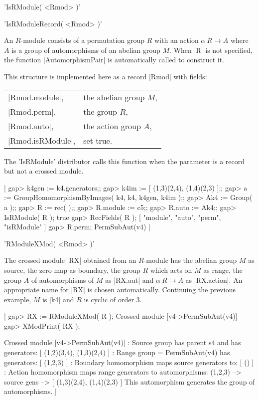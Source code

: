 %

'IsRModule( <Rmod> )'

'IsRModuleRecord( <Rmod> )'

An $R$-module consists of a permutation group $R$ with an action
$\alpha \: R \to A$  where  $A$  is a group of automorphisms
of an abelian group $M$.  When  |R|  is not specified, the function
|AutomorphismPair|  is automatically called to construct it.

This structure is implemented here as a record |Rmod| with fields:

\begin{tabular}{ll}
|Rmod.module|,     & the abelian group $M$,   \\
|Rmod.perm|,       & the group $R$,           \\
|Rmod.auto|,       & the action group $A$,    \\
|Rmod.isRModule|,  & set true.
\end{tabular}

The 'IsRModule' distributor calls this function when the parameter
is a record but not a crossed module.

|    gap> k4gen := k4.generators;;
    gap> k4im := [ (1,3)(2,4), (1,4)(2,3) ];;
    gap> a := GroupHomomorphismByImages( k4, k4, k4gen, k4im );;
    gap> Ak4 := Group( a );;
    gap> R := rec( );;
    gap> R.module := c5;;
    gap> R.auto := Ak4;;
    gap> IsRModule( R );
    true
    gap> RecFields( R );
    [ "module", "auto", "perm", "isRModule" ]
    gap> R.perm;
    PermSubAut(v4)   |

%

'RModuleXMod( <Rmod> )'

The crossed module |RX| obtained from an $R$-module has the abelian group $M$ 
as source, the zero map as boundary, the group $R$ which acts on $M$ as range,
the group $A$ of automorphisms of $M$ as |RX.aut| and
$\alpha \: R \to A$  as |RX.action|.
An appropriate name for |RX| is chosen automatically.
Continuing the previous example, $M$ is |k4| and $R$ is cyclic of order $3$.

|    gap> RX := RModuleXMod( R );
    Crossed module [v4->PermSubAut(v4)]
    gap> XModPrint( RX );

    Crossed module [v4->PermSubAut(v4)]
    : Source group has parent s4 and has generators:
      [ (1,2)(3,4), (1,3)(2,4) ]
    : Range group = PermSubAut(v4) has generators:
      [ (1,2,3) ]
    : Boundary homomorphism maps source generators to:
      [ () ]
    : Action homomorphism maps range generators to automorphisms:
      (1,2,3) --> { source gens --> [ (1,3)(2,4), (1,4)(2,3) ] }
      This automorphism generates the group of automorphisms.    |

